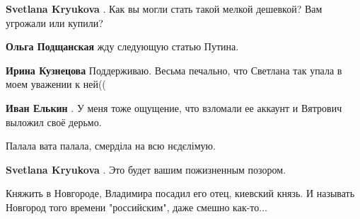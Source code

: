 \begin{itemize}
\begin{itemize}
\textbf{Svetlana Kryukova} . Как вы могли стать такой мелкой дешевкой? Вам угрожали или купили?


 
\textbf{Ольга Подщанская} жду следующую статью Путина.

 
\textbf{Ирина Кузнецова} Поддерживаю. Весьма печально, что Светлана так упала в моем уважении к ней((

 
\textbf{Иван Елькин} . У меня тоже ощущение, что взломали ее аккаунт и Вятрович выложил своё дерьмо.

 
Палала вата палала, смерділа на всю нєдєлімую.

 
\textbf{Svetlana Kryukova} . Это будет вашим пожизненным позором.

 
Княжить в Новгороде, Владимира посадил его отец, киевский князь. И называть Новгород того времени "российским", даже смешно как-то...

 

\end{itemize}
\end{itemize}

